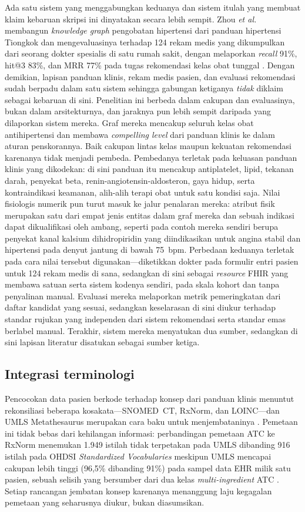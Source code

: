 Ada satu sistem yang menggabungkan keduanya dan sistem itulah yang membuat klaim
kebaruan skripsi ini dinyatakan secara lebih sempit. Zhou \textit{et al.} membangun
\emph{knowledge graph} pengobatan hipertensi dari panduan hipertensi Tiongkok dan
mengevaluasinya terhadap 124 rekam medis yang dikumpulkan dari seorang dokter
spesialis di satu rumah sakit, dengan melaporkan \emph{recall} 91\%, hit@3
83\%, dan MRR 77\% pada tugas rekomendasi kelas obat tunggal \cite{zhou2022}. Dengan
demikian, lapisan panduan klinis, rekam medis pasien, dan evaluasi rekomendasi sudah berpadu dalam
satu sistem sehingga gabungan ketiganya \emph{tidak} diklaim sebagai kebaruan di sini. Penelitian ini berbeda dalam cakupan dan evaluasinya, bukan dalam arsitekturnya, dan jaraknya pun lebih sempit daripada yang dilaporkan sistem mereka. Graf mereka mencakup seluruh
kelas obat antihipertensi dan membawa \emph{compelling level} dari panduan klinis ke dalam
aturan penskorannya. Baik cakupan lintas kelas maupun kekuatan rekomendasi karenanya tidak
menjadi pembeda. Pembedanya terletak pada keluasan panduan klinis yang dikodekan: di sini
panduan itu mencakup antiplatelet, lipid, tekanan darah, penyekat beta,
renin-angiotensin-aldosteron, gaya hidup, serta kontraindikasi keamanan, alih-alih terapi
obat untuk satu kondisi saja. Nilai fisiologis
numerik pun turut masuk ke jalur penalaran mereka: atribut fisik merupakan satu dari empat
jenis entitas dalam graf mereka dan sebuah indikasi dapat dikualifikasi oleh ambang, seperti
pada contoh mereka sendiri berupa penyekat kanal kalsium dihidropiridin yang diindikasikan
untuk angina stabil dan hipertensi pada denyut jantung di bawah 75~bpm. Perbedaan keduanya terletak pada cara nilai tersebut digunakan---diketikkan dokter pada formulir entri pasien
untuk 124 rekam medis di sana, sedangkan di sini sebagai \emph{resource} FHIR yang membawa satuan
serta sistem kodenya sendiri, pada skala kohort dan tanpa penyalinan manual. Evaluasi mereka
melaporkan metrik pemeringkatan dari daftar kandidat yang sesuai, sedangkan keselarasan di sini diukur
terhadap standar rujukan yang independen dari sistem rekomendasi serta standar emas
berlabel manual. Terakhir, sistem mereka menyatukan dua sumber, sedangkan di sini lapisan
literatur disatukan sebagai sumber ketiga.

\subsection{Integrasi terminologi}
Pencocokan data pasien berkode terhadap konsep dari panduan klinis menuntut rekonsiliasi beberapa
kosakata---SNOMED~CT, RxNorm, dan LOINC---dan UMLS Metathesaurus merupakan cara baku
untuk menjembataninya \cite{umls}. Pemetaan ini tidak bebas dari kehilangan informasi: perbandingan
pemetaan ATC ke RxNorm menemukan 1.949 istilah tidak terpetakan pada UMLS dibanding
916 istilah pada OHDSI \emph{Standardized Vocabularies} meskipun UMLS mencapai
cakupan lebih tinggi (96,5\% dibanding 91\%) pada sampel data EHR milik satu pasien,
sebuah selisih yang bersumber dari dua kelas \emph{multi-ingredient} ATC \cite{degroot2024}.
Setiap rancangan jembatan konsep karenanya menanggung laju kegagalan pemetaan yang
seharusnya diukur, bukan diasumsikan.

